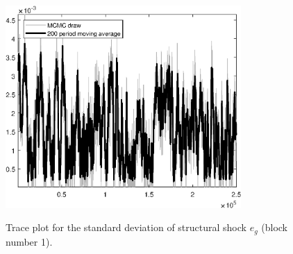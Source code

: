 \begin{figure}[H]
\centering
  \includegraphics[width=0.8\textwidth]{BRS_aggregate/graphs/TracePlot_SE_e_g_blck_1}\\
    \caption{Trace plot for the standard deviation of structural shock ${e_g}$ (block number 1).}
\end{figure}
